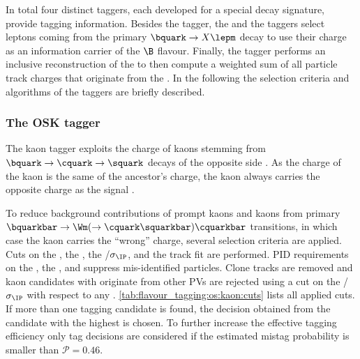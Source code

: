 In total four distinct \OS taggers, each developed for a special \OS decay
signature, provide tagging information. Besides the \OSK tagger, the \OSe and
the \OSm taggers select leptons coming from the primary $\bquark \to X \lepm$
decay to use their charge as an information carrier of the $\B$ flavour.
Finally, the \OSvtx tagger performs an inclusive reconstruction of the \OS \SV
to then compute a weighted sum of all particle track charges that originate from
the \SV. In the following the selection criteria and algorithms of the \OS
taggers are briefly described.
 
\subsubsection{The \acl{OSK} tagger}
\label{sec:flavour_tagging:os:kaon}

The kaon tagger exploits the charge of kaons stemming from $\bquark \to
\cquark \to \squark$ decays of the opposite side \bhadron. As the charge of the
kaon is the same of the ancestor's charge, the kaon always carries the opposite
charge as the signal \Bmeson.

To reduce background contributions of prompt kaons and kaons from primary
$\bquarkbar \to \Wm (\to \cquark \squarkbar) \cquarkbar$ transitions, in which
case the kaon carries the \enquote{wrong} charge, several selection criteria are
applied. Cuts on the \pT, the \IP, the \IP/$\sigma_\text{\IP}$, and the track
fit \chisqndf are performed. \Ac{PID} requirements on the \DLLKpi, the \DLLppi,
and \DLLmupi suppress mis-identified particles. Clone tracks are removed and
kaon candidates with originate from other \acp{PV} are rejected using a cut on
the \IP/$\sigma_\text{\IP}$ with respect to any \PV.
\cref{tab:flavour_tagging:os:kaon:cuts} lists all applied cuts. If more than one
tagging candidate is found, the decision obtained from the candidate with the
highest \pT is chosen. To further increase the effective tagging efficiency only
tag decisions are considered if the estimated mistag probability is smaller than
$\mathcal{P}=0.46$.

